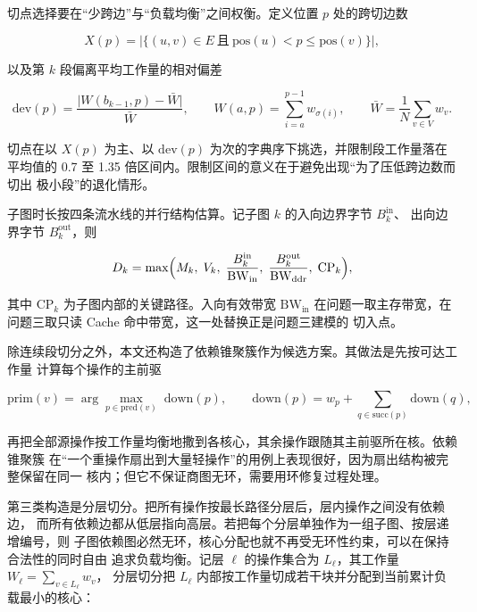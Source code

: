 \documentclass[bwprint]{gmcmthesis}
\begin{document}
切点选择要在“少跨边”与“负载均衡”之间权衡。定义位置 $p$ 处的跨切边数

\begin{equation}
X(p)=\bigl|\{(u,v)\in E\ \text{且}\ \mathrm{pos}(u)<p\le \mathrm{pos}(v)\}\bigr|,
\end{equation}

以及第 $k$ 段偏离平均工作量的相对偏差

\begin{equation}
\mathrm{dev}(p)=\frac{\bigl|W(b_{k-1},p)-\bar W\bigr|}{\bar W},
\qquad
W(a,p)=\sum_{i=a}^{p-1}w_{\sigma(i)},
\qquad
\bar W=\frac{1}{N}\sum_{v\in V}w_v .
\end{equation}

切点在以 $X(p)$ 为主、以 $\mathrm{dev}(p)$ 为次的字典序下挑选，并限制段工作量落在
平均值的 0.7 至 1.35 倍区间内。限制区间的意义在于避免出现“为了压低跨边数而切出
极小段”的退化情形。

子图时长按四条流水线的并行结构估算。记子图 $k$ 的入向边界字节 $B^{\mathrm{in}}_k$、
出向边界字节 $B^{\mathrm{out}}_k$，则

\begin{equation}
D_k=\max\Bigl(M_k,\;V_k,\;\frac{B^{\mathrm{in}}_k}{\mathrm{BW}_{\mathrm{in}}},\;
\frac{B^{\mathrm{out}}_k}{\mathrm{BW}_{\mathrm{ddr}}},\;\mathrm{CP}_k\Bigr),
\end{equation}

其中 $\mathrm{CP}_k$ 为子图内部的关键路径。入向有效带宽 $\mathrm{BW}_{\mathrm{in}}$
在问题一取主存带宽，在问题三取只读 Cache 命中带宽，这一处替换正是问题三建模的
切入点。

除连续段切分之外，本文还构造了依赖锥聚簇作为候选方案。其做法是先按可达工作量
计算每个操作的主前驱

\begin{equation}
\mathrm{prim}(v)=\arg\max_{p\in \mathrm{pred}(v)}\;\mathrm{down}(p),
\qquad
\mathrm{down}(p)=w_p+\sum_{q\in \mathrm{succ}(p)}\mathrm{down}(q),
\end{equation}

再把全部源操作按工作量均衡地撒到各核心，其余操作跟随其主前驱所在核。依赖锥聚簇
在“一个重操作扇出到大量轻操作”的用例上表现很好，因为扇出结构被完整保留在同一
核内；但它不保证商图无环，需要用环修复过程处理。

第三类构造是分层切分。把所有操作按最长路径分层后，层内操作之间没有依赖边，
而所有依赖边都从低层指向高层。若把每个分层单独作为一组子图、按层递增编号，则
子图依赖图必然无环，核心分配也就不再受无环性约束，可以在保持合法性的同时自由
追求负载均衡。记层 $\ell$ 的操作集合为 $L_\ell$，其工作量 $W_\ell=\sum_{v\in L_\ell}w_v$，
分层切分把 $L_\ell$ 内部按工作量切成若干块并分配到当前累计负载最小的核心：
\end{document}
